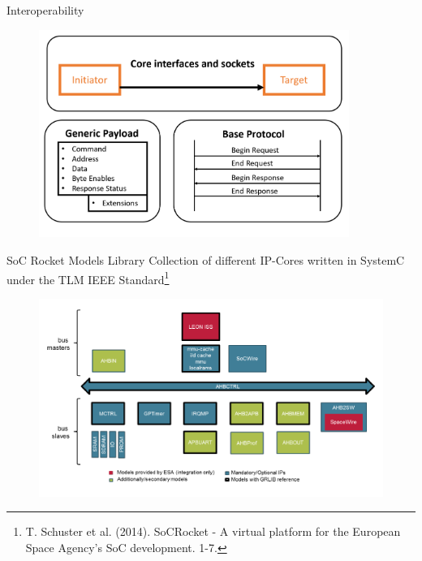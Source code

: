 \begin{frame}{Interoperability}
\begin{figure}
\label{fig:int}
\centering
\includegraphics[width=0.9\textwidth]{pictures/Interoperability.PNG}
\end{figure}
\end{frame}
\begin{frame}{SoC Rocket Models Library}
Collection of different IP-Cores written in SystemC under the TLM IEEE Standard\footnote{T. Schuster et al. (2014). SoCRocket - A virtual platform for the European Space Agency's SoC development. 1-7.}
\begin{figure}
\label{fig:Lib}
\centering
\includegraphics[width=1\textwidth]{pictures/ModelsLibrary.PNG}
\end{figure}
\end{frame}